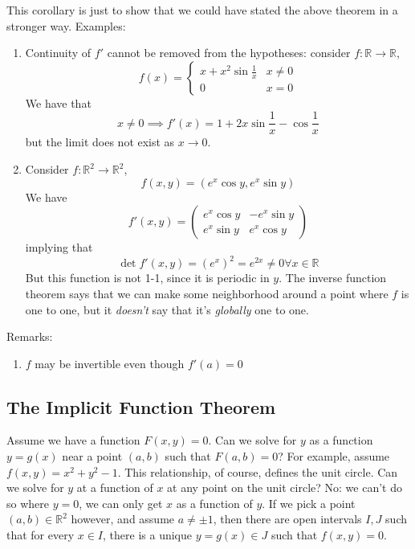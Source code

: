\documentclass{article}
\newcommand{\reals}[0]{\mathbb{R}}
\begin{document}
This corollary is just to show that we could have stated the above theorem in a stronger way. Examples:
\begin{enumerate}
  \item Continuity of \(f'\) cannot be removed from the hypotheses: consider \(f: \reals \to \reals\),
  \begin{equation}f(x) = \left\{\begin{array}{cc}x + x^2\sin\frac{1}{x} & x \neq 0 \\ 0 & x = 0\end{array}\right.\end{equation}
  We have that
  \begin{equation}x \neq 0 \implies f'(x) = 1 + 2x\sin\frac{1}{x} - \cos\frac{1}{x}\end{equation}
  but the limit does not exist as \(x \to 0\).

  \item Consider \(f: \reals^2 \to \reals^2\),
  \begin{equation}f(x, y) = (e^x\cos y, e^x\sin y)\end{equation}
  We have
  \begin{equation}f'(x, y) = \begin{pmatrix} e^x\cos y & -e^x\sin y \\ e^x\sin y & e^x\cos y \end{pmatrix}\end{equation}
  implying that
  \begin{equation}\det f'(x, y) = (e^x)^2 = e^{2x} \neq 0 \forall x \in \reals\end{equation}
  But this function is not 1-1, since it is periodic in \(y\). The inverse function theorem says that we can make some neighborhood around a point where \(f\) is one to one, but it \textit{doesn't} say that it's \textit{globally} one to one.

\end{enumerate}
Remarks:
\begin{enumerate}
  \item \(f\) may be invertible even though \(f'(a) = 0\)
\end{enumerate}

\subsection{The Implicit Function Theorem}


Assume we have a function \(F(x, y) = 0\). Can we solve for \(y\) as a function \(y = g(x)\) near a point \((a, b)\) such that \(F(a, b) = 0\)?
For example, assume \(f(x, y) = x^2 + y^2 - 1\).
This relationship, of course, defines the unit circle. Can we solve for \(y\) at a function of \(x\) at any point on the unit circle? No: we can't do so where \(y = 0\), we can only get \(x\) as a function of \(y\).
If we pick a point \((a, b) \in \reals^2\) however, and assume \(a \neq \pm 1\), then there are open intervals \(I, J\) such that for every \(x \in I\), there is a unique \(y = g(x) \in J\) such that \(f(x, y) = 0\).
\end{document}
